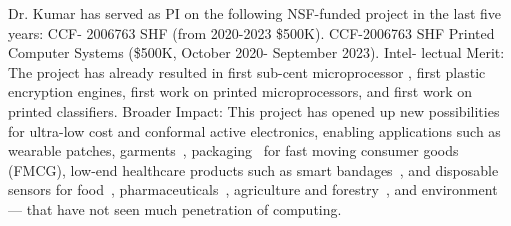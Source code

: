 Dr. Kumar has served as PI on the following NSF-funded project in the last five
years: CCF- 2006763 SHF (from 2020-2023 \$500K).  CCF-2006763 SHF Printed
Computer Systems (\$500K, October 2020- September 2023). Intel- lectual Merit:
The project has already resulted in first sub-cent microprocessor
\cite{bleier22}, first plastic encryption engines\cite{bleier23}, first work on printed
microprocessors\cite{bleier20}, and first work on printed classifiers\cite{mubarik20}. Broader
Impact: This project has opened up new possibilities for ultra-low cost and
conformal active electronics, enabling applications such as wearable patches\cite{},
garments~\cite{}, packaging~\cite{} for fast moving consumer goods (FMCG),
low-end healthcare products such as smart bandages~\cite{}, and disposable sensors
for food~\cite{}, pharmaceuticals~\cite{}, agriculture and forestry~\cite{}, and
environment~\cite{} — that have not seen much penetration of computing.
